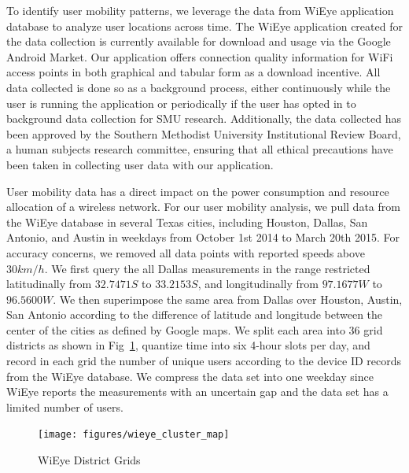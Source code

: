 To identify user mobility patterns, we leverage the data from WiEye application database to analyze user locations across time.
The WiEye application created for the data collection is currently available for download and usage via the Google Android Market. 
Our application offers connection quality information for WiFi access points in both graphical and tabular form as a download incentive. 
All data collected is done so as a background process, either continuously while the user is running the application or periodically if the user has opted in to background data collection for SMU research. 
Additionally, the data collected has been approved by the Southern Methodist University Institutional Review Board, a human subjects research committee, ensuring that all ethical precautions have been taken in collecting user data with our application.


User mobility data has a direct impact on the power consumption and resource allocation of a wireless network.
For our user mobility analysis, we pull data from the WiEye database in several Texas cities, including Houston, Dallas, San Antonio, and Austin in weekdays from October 1st 2014 to March 20th 2015.
For accuracy concerns, we removed all data points with reported speeds above $30km/h$.
We first query the all Dallas measurements in the range restricted latitudinally from 
$32.7471 S$ to $33.2153 S$, and longitudinally from $97.1677 W$ to $96.5600 W$.
We then superimpose the same area from Dallas over Houston, Austin, San Antonio according to the difference of latitude and longitude between the center of the cities as defined by Google maps.
We split each area into 36 grid districts as shown in Fig~\ref{fig:wieye_map}, quantize time into six 4-hour slots per day, and record in each grid the number of unique users according to the device ID records from the WiEye database.
We compress the data set into one weekday since WiEye reports the measurements with an uncertain gap and the data set has a limited number of users.


\begin{figure}[h]
\vspace{-0.0in}
\centering
\texttt{[image: figures/wieye\_cluster\_map]}
\vspace{-0.1in}
\caption{WiEye District Grids}
\label{fig:wieye_map}
\vspace{-0.1in}
\end{figure}

